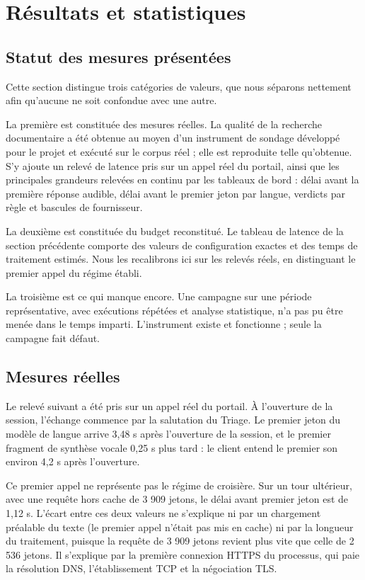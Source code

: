 \section{Résultats et statistiques}

\subsection{Statut des mesures présentées}

Cette section distingue trois catégories de valeurs, que nous séparons nettement afin qu'aucune ne soit confondue avec une autre.

La première est constituée des mesures réelles. La qualité de la recherche documentaire a été obtenue au moyen d'un instrument de sondage développé pour le projet et exécuté sur le corpus réel ; elle est reproduite telle qu'obtenue. S'y ajoute un relevé de latence pris sur un appel réel du portail, ainsi que les principales grandeurs relevées en continu par les tableaux de bord : délai avant la première réponse audible, délai avant le premier jeton par langue, verdicts par règle et bascules de fournisseur.

La deuxième est constituée du budget reconstitué. Le tableau de latence de la section précédente comporte des valeurs de configuration exactes et des temps de traitement estimés. Nous les recalibrons ici sur les relevés réels, en distinguant le premier appel du régime établi.

La troisième est ce qui manque encore. Une campagne sur une période représentative, avec exécutions répétées et analyse statistique, n'a pas pu être menée dans le temps imparti. L'instrument existe et fonctionne ; seule la campagne fait défaut.

\subsection{Mesures réelles}

Le relevé suivant a été pris sur un appel réel du portail. À l'ouverture de la session, l'échange commence par la salutation du Triage. Le premier jeton du modèle de langue arrive 3,48 s après l'ouverture de la session, et le premier fragment de synthèse vocale 0,25 s plus tard : le client entend le premier son environ 4,2 s après l'ouverture.

Ce premier appel ne représente pas le régime de croisière. Sur un tour ultérieur, avec une requête hors cache de 3 909 jetons, le délai avant premier jeton est de 1,12 s. L'écart entre ces deux valeurs ne s'explique ni par un chargement préalable du texte (le premier appel n'était pas mis en cache) ni par la longueur du traitement, puisque la requête de 3 909 jetons revient plus vite que celle de 2 536 jetons. Il s'explique par la première connexion HTTPS du processus, qui paie la résolution DNS, l'établissement TCP et la négociation TLS.

